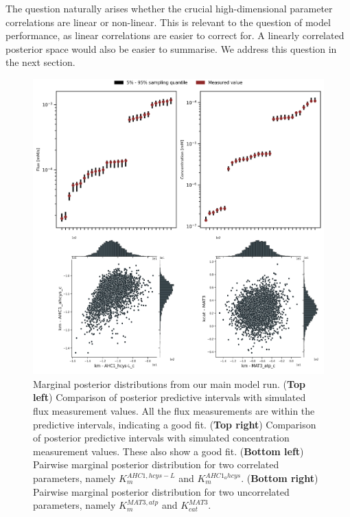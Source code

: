 \documentclass[journal=asbcd6,manuscript=article,layout=traditional]{achemso}
\begin{document}
The question naturally arises whether the crucial high-dimensional
parameter correlations are linear or non-linear. This is relevant to the
question of model performance, as linear correlations are easier to
correct for. A linearly correlated posterior space would also be easier
to summarise. We address this question in the next section.

\begin{figure}

\begin{minipage}{\linewidth}

\includegraphics{./figures/posterior.png}

\end{minipage}%

\caption{\label{fig-posterior}Marginal posterior distributions from our
main model run. (\textbf{Top left}) Comparison of posterior predictive
intervals with simulated flux measurement values. All the flux
measurements are within the predictive intervals, indicating a good fit.
(\textbf{Top right}) Comparison of posterior predictive intervals with
simulated concentration measurement values. These also show a good fit.
(\textbf{Bottom left}) Pairwise marginal posterior distribution for two
correlated parameters, namely \(K_m^{AHC1,hcys-L}\) and
\(K_m^{AHC1_ahcys}\). (\textbf{Bottom right}) Pairwise marginal
posterior distribution for two uncorrelated parameters, namely
\(K_m^{MAT3,atp}\) and \(K_{cat}^{MAT3}\).}

\end{figure}%
\end{document}
